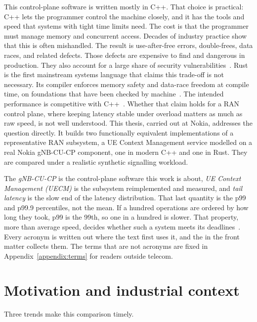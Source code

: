 \documentclass[english,oneside,a4paper,censored,csm,software-track-2020]{HYthesisML}
\begin{document}
This control-plane software is written mostly in C++. That choice is practical: C++ lets
the programmer control the machine closely, and it has the tools and speed that systems
with tight time limits need. The cost is that the programmer must manage memory and
concurrent access. Decades of industry practice show that this is often mishandled. The
result is use-after-free errors, double-frees, data races, and related defects. Those
defects are expensive to find and dangerous in production. They also account for a large
share of security vulnerabilities~\cite{msrc2019memory,google2022android}. Rust is the first mainstream systems
language that claims this trade-off is not necessary. Its compiler enforces memory safety and
data-race freedom at compile time, on foundations that have been checked by
machine~\cite{klabnik2023rust,jung2018rustbelt}. The intended performance is competitive with
C++~\cite{balasubramanian2017rust}. Whether that claim holds for a RAN control plane, where
keeping latency stable under overload matters as much as raw speed, is not well understood.
This thesis, carried out at Nokia, addresses the question directly. It builds two functionally
equivalent implementations of a representative RAN subsystem, a UE Context Management
service modelled on a real Nokia gNB-CU-CP component, one in modern C++ and one in Rust. They
are compared under a realistic synthetic signalling workload.

The \emph{gNB-CU-CP} is the control-plane software this work is about, \emph{UE Context
Management (UECM)} is the subsystem reimplemented and measured, and \emph{tail latency} is the
slow end of the latency distribution. That last quantity is the p99 and p99.9 percentiles,
not the mean. If a hundred operations are ordered by how long they took, p99 is the 99th,
so one in a hundred is slower. That property, more than average speed, decides whether such a
system meets its deadlines~\cite{dean2013tail,barroso2017microseconds}. Every acronym is
written out where the text first uses it, and the \nomname{} in the front matter collects
them. The terms that are not acronyms are fixed in Appendix~\ref{appendix:terms} for readers
outside telecom.

\section{Motivation and industrial context}\label{sec:motivation}
Three trends make this comparison timely.
\end{document}
